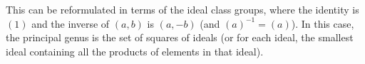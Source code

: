 This can be reformulated in terms of the ideal class groups, where the identity is $(1)$ and the inverse of $(a,b)$ is $(a,-b)$ (and $(a)^{-1} = (a)$). In this case, the principal genus is the set of squares of ideals (or for each ideal, the smallest ideal containing all the products of elements in that ideal).

